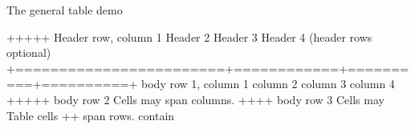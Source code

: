 \documentclass[letterpaper,11pt,english]{sphinxmanual}
\begin{document}
\begin{sphinxVerbatim}[commandchars=\\\{\}]
 
  The general table demo

        +\PYGZhy{}\PYGZhy{}\PYGZhy{}\PYGZhy{}\PYGZhy{}\PYGZhy{}\PYGZhy{}\PYGZhy{}\PYGZhy{}\PYGZhy{}\PYGZhy{}\PYGZhy{}\PYGZhy{}\PYGZhy{}\PYGZhy{}\PYGZhy{}\PYGZhy{}\PYGZhy{}\PYGZhy{}\PYGZhy{}\PYGZhy{}\PYGZhy{}\PYGZhy{}\PYGZhy{}+\PYGZhy{}\PYGZhy{}\PYGZhy{}\PYGZhy{}\PYGZhy{}\PYGZhy{}\PYGZhy{}\PYGZhy{}\PYGZhy{}\PYGZhy{}\PYGZhy{}\PYGZhy{}+\PYGZhy{}\PYGZhy{}\PYGZhy{}\PYGZhy{}\PYGZhy{}\PYGZhy{}\PYGZhy{}\PYGZhy{}\PYGZhy{}\PYGZhy{}+\PYGZhy{}\PYGZhy{}\PYGZhy{}\PYGZhy{}\PYGZhy{}\PYGZhy{}\PYGZhy{}\PYGZhy{}\PYGZhy{}\PYGZhy{}+
         Header row, column 1   \textbar{} Header 2   \textbar{} Header 3 \textbar{} Header 4 \textbar{}
         (header rows optional) \textbar{}            \textbar{}          \textbar{}          \textbar{}
        +========================+============+==========+==========+
         body row 1, column 1   \textbar{} column 2   \textbar{} column 3 \textbar{} column 4 \textbar{}
        +\PYGZhy{}\PYGZhy{}\PYGZhy{}\PYGZhy{}\PYGZhy{}\PYGZhy{}\PYGZhy{}\PYGZhy{}\PYGZhy{}\PYGZhy{}\PYGZhy{}\PYGZhy{}\PYGZhy{}\PYGZhy{}\PYGZhy{}\PYGZhy{}\PYGZhy{}\PYGZhy{}\PYGZhy{}\PYGZhy{}\PYGZhy{}\PYGZhy{}\PYGZhy{}\PYGZhy{}+\PYGZhy{}\PYGZhy{}\PYGZhy{}\PYGZhy{}\PYGZhy{}\PYGZhy{}\PYGZhy{}\PYGZhy{}\PYGZhy{}\PYGZhy{}\PYGZhy{}\PYGZhy{}+\PYGZhy{}\PYGZhy{}\PYGZhy{}\PYGZhy{}\PYGZhy{}\PYGZhy{}\PYGZhy{}\PYGZhy{}\PYGZhy{}\PYGZhy{}+\PYGZhy{}\PYGZhy{}\PYGZhy{}\PYGZhy{}\PYGZhy{}\PYGZhy{}\PYGZhy{}\PYGZhy{}\PYGZhy{}\PYGZhy{}+
         body row 2             \textbar{} Cells may span columns.          \textbar{}
        +\PYGZhy{}\PYGZhy{}\PYGZhy{}\PYGZhy{}\PYGZhy{}\PYGZhy{}\PYGZhy{}\PYGZhy{}\PYGZhy{}\PYGZhy{}\PYGZhy{}\PYGZhy{}\PYGZhy{}\PYGZhy{}\PYGZhy{}\PYGZhy{}\PYGZhy{}\PYGZhy{}\PYGZhy{}\PYGZhy{}\PYGZhy{}\PYGZhy{}\PYGZhy{}\PYGZhy{}+\PYGZhy{}\PYGZhy{}\PYGZhy{}\PYGZhy{}\PYGZhy{}\PYGZhy{}\PYGZhy{}\PYGZhy{}\PYGZhy{}\PYGZhy{}\PYGZhy{}\PYGZhy{}+\PYGZhy{}\PYGZhy{}\PYGZhy{}\PYGZhy{}\PYGZhy{}\PYGZhy{}\PYGZhy{}\PYGZhy{}\PYGZhy{}\PYGZhy{}\PYGZhy{}\PYGZhy{}\PYGZhy{}\PYGZhy{}\PYGZhy{}\PYGZhy{}\PYGZhy{}\PYGZhy{}\PYGZhy{}\PYGZhy{}\PYGZhy{}+
         body row 3             \textbar{} Cells may  \textbar{} \PYGZhy{} Table cells       \textbar{}
        +\PYGZhy{}\PYGZhy{}\PYGZhy{}\PYGZhy{}\PYGZhy{}\PYGZhy{}\PYGZhy{}\PYGZhy{}\PYGZhy{}\PYGZhy{}\PYGZhy{}\PYGZhy{}\PYGZhy{}\PYGZhy{}\PYGZhy{}\PYGZhy{}\PYGZhy{}\PYGZhy{}\PYGZhy{}\PYGZhy{}\PYGZhy{}\PYGZhy{}\PYGZhy{}\PYGZhy{}+ span rows. \textbar{} \PYGZhy{} contain           \textbar{}

\end{sphinxVerbatim}
\end{document}
